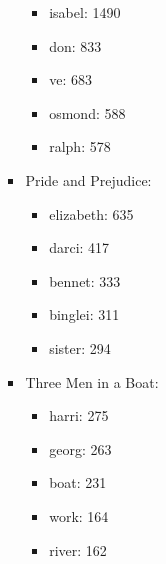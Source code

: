 \documentclass[a4paper,11pt,oneside]{book}
\begin{document}
\begin{enumerate}
\begin{enumerate}
\begin{itemize}
												\begin{itemize}
													\item{isabel:	1490}
													\item{don:		833}
													\item{ve:		683}
													\item{osmond:	588}
													\item{ralph:	578}
												\end{itemize}
									\item Pride and Prejudice:
												\begin{itemize}
													\item{elizabeth:	635}
													\item{darci:	417}
													\item{bennet:	333}
													\item{binglei:	311}
													\item{sister:	294}
												\end{itemize}
									\item Three Men in a Boat:
												\begin{itemize}
													\item{harri:		275}
													\item{georg:	263}
													\item{boat:		231}
													\item{work:	164}
													\item{river:	162}
												\end{itemize}
								\end{itemize}
					\end{enumerate}
						

%
%
%
%
%
%
%
%
%
%
%
%
%
%



\end{enumerate}
\end{document}
